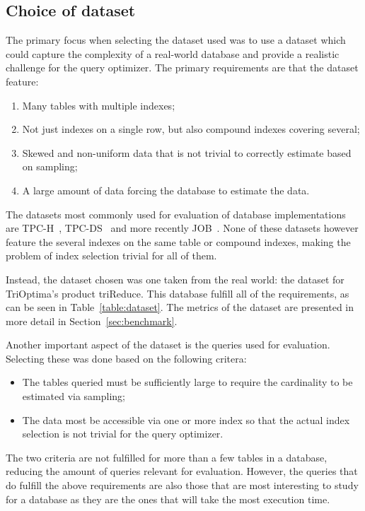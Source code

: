 \subsection{Choice of dataset}\label{sec:dataset}
The primary focus when selecting the dataset used was to use a dataset which
could capture the complexity of a real-world database and provide a realistic
challenge for the query optimizer. The primary requirements are that the dataset
feature:
\begin{enumerate}
\item Many tables with multiple indexes;
\item Not just indexes on a single row, but also compound indexes covering
  several;
\item Skewed and non-uniform data that is not trivial to correctly estimate
  based on sampling;
\item A large amount of data forcing the database to estimate the data.
\end{enumerate}

The datasets most commonly used for evaluation of database implementations are
TPC-H~\cite{tpc_th}, TPC-DS~\cite{tpc_tha} and more recently
JOB~\cite{leis_2015_how_hgaqor}. None of these datasets however feature the
several indexes on the same table or compound indexes, making the problem of
index selection trivial for all of them.

Instead, the dataset chosen was one taken from the real world: the dataset for
TriOptima's product triReduce. This database fulfill all of the requirements, as
can be seen in Table~\ref{table:dataset}. The metrics of the dataset are
presented in more detail in Section~\ref{sec:benchmark}.

Another important aspect of the dataset is the queries used for evaluation.
Selecting these was done based on the following critera:
\begin{itemize}
\item The tables queried must be sufficiently large to require the cardinality to be
  estimated via sampling;
\item The data most be accessible via one or more index so that the actual index
  selection is not trivial for the query optimizer.
\end{itemize}

The two criteria are not fulfilled for more than a few tables in a database,
reducing the amount of queries relevant for evaluation. However, the queries
that do fulfill the above requirements are also those that are most interesting
to study for a database as they are the ones that will take the most execution time.

